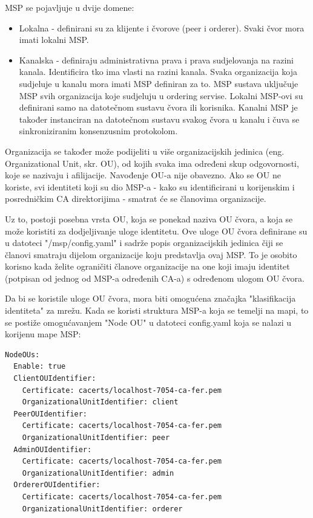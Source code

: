 \documentclass[times, utf8, diplomski]{fer}
\begin{document}
MSP se pojavljuje u dvije domene:
\begin{itemize}
\item Lokalna - definirani su za klijente i čvorove (peer i orderer). Svaki čvor mora imati lokalni MSP.
\item Kanalska - definiraju administrativna prava i prava sudjelovanja na razini kanala.  Identificira tko ima vlasti na razini kanala.  Svaka organizacija koja sudjeluje u kanalu mora imati MSP definiran za to.  MSP sustava uključuje MSP svih organizacija koje sudjeluju u ordering servise.  Lokalni MSP-ovi su definirani samo na datotečnom sustavu čvora ili korisnika.  Kanalni MSP je također instanciran na datotečnom sustavu svakog čvora u kanalu i čuva se sinkroniziranim konsenzusnim protokolom.
\end{itemize}

Organizacija se također može podijeliti u više organizacijskih jedinica (eng. Organizational Unit, skr. OU), od kojih svaka ima određeni skup odgovornosti, koje se nazivaju i afilijacije.   Navođenje OU-a nije obavezno. Ako se OU ne koriste, svi identiteti koji su dio MSP-a - kako su identificirani u korijenskim i posredničkim CA direktorijima - smatrat će se članovima organizacije.

Uz to, postoji posebna vrsta OU, koja se ponekad naziva OU čvora, a koja se može koristiti za dodjeljivanje uloge identitetu. Ove uloge OU čvora definirane su u datoteci "/msp/config.yaml" i sadrže popis organizacijskih jedinica čiji se članovi smatraju dijelom organizacije koju predstavlja ovaj MSP. To je osobito korisno kada želite ograničiti članove organizacije na one koji imaju identitet (potpisan od jednog od MSP-a određenih CA-a) s određenom ulogom OU čvora. 

Da bi se koristile uloge OU čvora, mora biti omogućena značajka "klasifikacija identiteta" za mrežu. Kada se koristi struktura MSP-a koja se temelji na mapi, to se postiže omogućavanjem "Node OU" u datoteci config.yaml koja se nalazi u korijenu mape MSP:

\begin{verbatim}
NodeOUs:
  Enable: true
  ClientOUIdentifier:
    Certificate: cacerts/localhost-7054-ca-fer.pem
    OrganizationalUnitIdentifier: client
  PeerOUIdentifier:
    Certificate: cacerts/localhost-7054-ca-fer.pem
    OrganizationalUnitIdentifier: peer
  AdminOUIdentifier:
    Certificate: cacerts/localhost-7054-ca-fer.pem
    OrganizationalUnitIdentifier: admin
  OrdererOUIdentifier:
    Certificate: cacerts/localhost-7054-ca-fer.pem
    OrganizationalUnitIdentifier: orderer
\end{verbatim}
\end{document}
